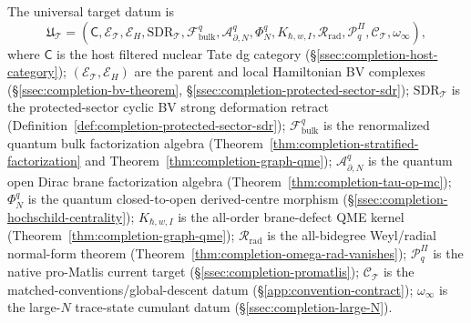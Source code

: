 \begin{defn}
\label{def:completion-universal-datum}
The universal target datum is
\[
  \mathfrak U_{\mathcal T}
  =(\mathsf C,\mathcal E_{\mathcal T},\mathcal E_H,
   \mathrm{SDR}_{\mathcal T},\mathcal F^q_{\mathrm{bulk}},
   \mathcal A^q_{\partial,N},\Phi^q_N,K_{\hbar,w,I},
   \mathcal R_{\mathrm{rad}},\mathcal P^\Pi_q,\mathcal C_{\mathcal T},
   \omega_\infty),
\]
where \(\mathsf C\) is the host filtered nuclear Tate dg category
(\S\ref{ssec:completion-host-category}); \((\mathcal E_{\mathcal T},
\mathcal E_H)\) are the parent and local Hamiltonian BV complexes
(\S\ref{ssec:completion-bv-theorem},
\S\ref{ssec:completion-protected-sector-sdr});
\(\mathrm{SDR}_{\mathcal T}\) is the protected-sector cyclic BV
strong deformation retract
(Definition~\ref{def:completion-protected-sector-sdr});
\(\mathcal F^q_{\mathrm{bulk}}\) is the renormalized quantum bulk
factorization algebra
(Theorem~\ref{thm:completion-stratified-factorization} and
Theorem~\ref{thm:completion-graph-qme});
\(\mathcal A^q_{\partial,N}\) is the quantum open Dirac brane
factorization algebra
(Theorem~\ref{thm:completion-tau-op-mc}); \(\Phi^q_N\) is the
quantum closed-to-open derived-centre morphism
(\S\ref{ssec:completion-hochschild-centrality}); \(K_{\hbar,w,I}\)
is the all-order brane-defect QME kernel
(Theorem~\ref{thm:completion-graph-qme});
\(\mathcal R_{\mathrm{rad}}\) is the all-bidegree Weyl/radial
normal-form theorem
(Theorem~\ref{thm:completion-omega-rad-vanishes});
\(\mathcal P^\Pi_q\) is the native pro-Matlis current target
(\S\ref{ssec:completion-promatlis}); \(\mathcal C_{\mathcal T}\)
is the matched-conventions/global-descent datum
(\S\ref{app:convention-contract});
\(\omega_\infty\) is the large-\(N\) trace-state cumulant datum
(\S\ref{ssec:completion-large-N}).
\end{defn}

